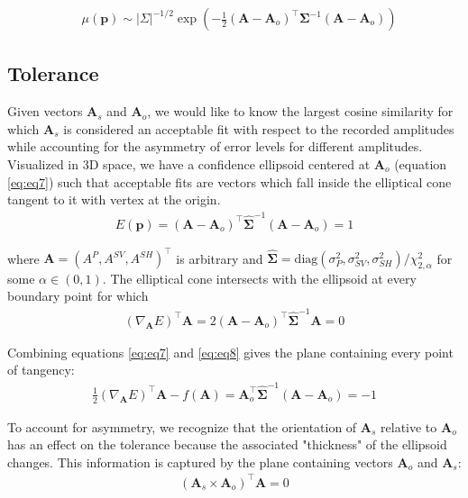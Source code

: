 \documentclass[preprint]{seismica}
\begin{document}
    \begin{align} \label{eq:eq6}
      &\mu(\bm{p}) \sim |\Sigma|^{-1/2} \exp \left( - \frac{1}{2} (\bm{A} - \bm{A}_o)^\top \bm{\Sigma}^{-1} (\bm{A} - \bm{A}_o) \right)
    \end{align}

    \subsection{Tolerance}
    Given vectors $\bm{A}_s$ and $\bm{A}_o$, we would like to know the largest cosine
    similarity for which $\bm{A}_s$ is considered an acceptable fit with respect to the recorded amplitudes
    while accounting for the asymmetry of error levels for different amplitudes. Visualized in 3D
    space, we have a confidence ellipsoid centered at $\bm{A}_o$ (equation \ref{eq:eq7}) such that
    acceptable fits are vectors which fall inside the elliptical cone tangent to it with vertex at the
    origin.
    \begin{align} \label{eq:eq7}
      E(\bm{p}) = (\bm{A} - \bm{A}_o)^\top \hat{\bm{\Sigma}}^{-1} (\bm{A} - \bm{A}_o)  = 1
    \end{align}
    
    \noindent where $\bm{A} = (A^P, A^{SV}, A^{SH})^\top$ is arbitrary
    and $\hat{\bm{\Sigma}} = \text{diag}(\sigma_P^2, \sigma_{SV}^2, \sigma_{SH}^2)/\chi^2_{2,\alpha}$ for some $\alpha \in (0,1)$. The elliptical
    cone intersects with the ellipsoid at every boundary point for which
    \begin{align} \label{eq:eq8}
      (\nabla_{\bm{A}} E)^\top \bm{A} = 2(\bm{A} - \bm{A}_o)^\top \hat{\bm{\Sigma}}^{-1} \bm{A} = 0
    \end{align}
    
    Combining equations \ref{eq:eq7} and \ref{eq:eq8} gives the plane containing every point of 
    tangency:
    \begin{align} \label{eq:eq9}
      \frac{1}{2} (\nabla_{\bm{A}} E)^\top \bm{A} - f(\bm{A}) = 
              \bm{A}_o^\top \hat{\bm{\Sigma}}^{-1} (\bm{A} - \bm{A}_o)  = -1
    \end{align}

    To account for asymmetry, we recognize that the orientation of $\bm{A}_s$ relative to $\bm{A}_o$
    has an effect on the tolerance because the associated "thickness" of the ellipsoid changes.
    This information is captured by the plane containing vectors $\bm{A}_o$ and $\bm{A}_s$:
    \begin{align} \label{eq:eq10}
      (\bm{A}_s \times \bm{A}_o)^\top \bm{A} = 0
    \end{align}
\end{document}

